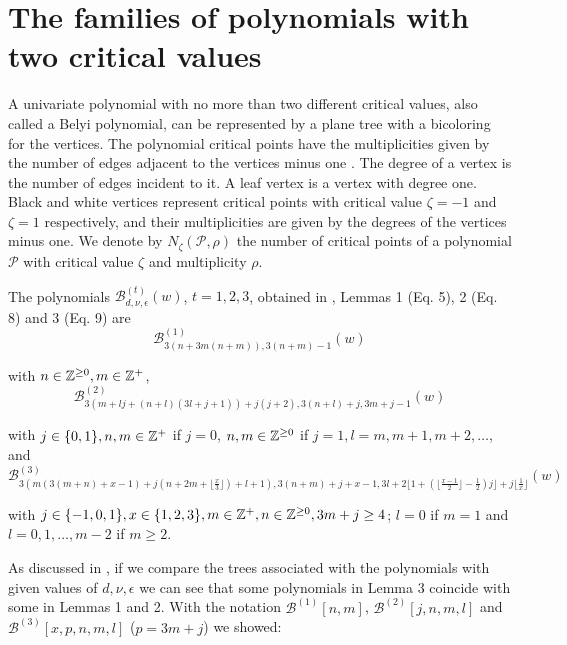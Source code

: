 \documentclass{birkjour_t2}
\theoremstyle{definition}
\theoremstyle{remark}
\numberwithin{equation}{section}
\begin{document}
 \section{The families of polynomials with two critical values}
 \bigskip\par
 A univariate polynomial with no more than two different critical values, also called a Belyi polynomial, can be represented by a plane tree with a bicoloring for the vertices. The polynomial critical points have the multiplicities given by the number of edges adjacent to the vertices minus one \cite{adr98, lab06}. The degree of a vertex is the number of edges incident to it. A leaf vertex is a vertex with degree one. Black and white vertices represent critical points with critical value $\zeta=-1$ and $\zeta=1$ respectively, and their multiplicities are given by the degrees of the vertices minus one. We denote by $N_{\zeta}(\mathcal{P}, \rho)$ the number of critical points of a polynomial $\mathcal{P}$ with critical value $\zeta$ and multiplicity $\rho$.
 \par
 The polynomials ${\mathcal{B}}^{(t)}_{d,\nu,\epsilon}(w)$, $t=1, 2, 3$, obtained in \cite{esc26}, Lemmas 1 (Eq. 5), 2 (Eq. 8) and 3 (Eq. 9) are
 \begin{equation}  
{\mathcal{B}}^{(1)}_{3(n+3m(n+m)), 3(n+m)-1}(w)
\end{equation}
\par\noindent
with $n\in {\Bbb{Z}}^{\geq 0},  m\in {\Bbb{Z}}^{+}$,
\begin{equation} 
{\mathcal{B}}^{(2)}_{3(m+lj+(n+l)(3l+j+1))+j(j+2), 3(n+l)+j, 3m+j-1}(w)
\end{equation} 
\par\noindent
with $j\in\{0,1\}, n, m\in {\Bbb{Z}}^{+}$ if $j=0$, $n,m \in {\Bbb{Z}}^{\geq 0}$ if $j=1, l=m, m+1, m+2, \dots $, and 
\begin{equation} 
{\mathcal{B}}^{(3)}_{3(m(3(m+n)+x-1)+j(n+2m+\lfloor \frac{x}{3}\rfloor)+l+1), 3(n+m)+j+x-1, 3l+2\lfloor 1+(\lfloor\frac{x-1}{2}\rfloor-\frac{1}{2})j\rfloor+j\lfloor \frac{1}{x}\rfloor}(w)  
\end{equation} 
\par\noindent
with $j\in\{-1,0,1\}, x\in\{1,2,3\},  m\in {\Bbb{Z}}^{+}, n\in {\Bbb{Z}}^{\geq 0}, 3m+j \geq 4$; $l=0$  if $m=1$ and $l=0,1,\dots ,m-2$ if $m\geq 2$. 
 \bigskip\par
As discussed in \cite{esc26}, if we compare the trees associated with the polynomials with given values of $d,\nu,\epsilon$ we can see that some polynomials in Lemma 3 coincide with some in Lemmas 1 and 2. With the notation ${\mathcal{B}}^{(1)}[n, m]$, ${\mathcal{B}}^{(2)}[j, n, m, l]$ and ${\mathcal{B}}^{(3)}[x, p, n, m, l]$ ($p=3m+j$) we showed: 
\end{document}
